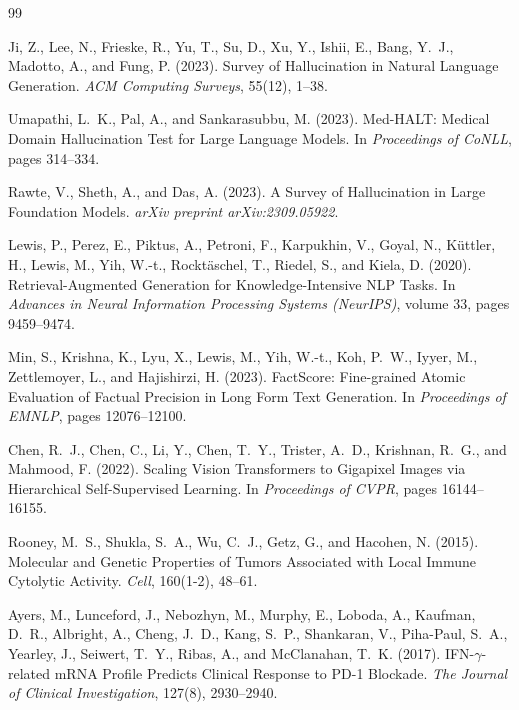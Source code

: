 \documentclass[11pt,twocolumn]{article}
\begin{document}
\begin{thebibliography}{99}

Ji, Z., Lee, N., Frieske, R., Yu, T., Su, D., Xu, Y., Ishii, E., Bang, Y.~J., Madotto, A., and Fung, P. (2023).
Survey of Hallucination in Natural Language Generation.
\emph{ACM Computing Surveys}, 55(12), 1--38.

Umapathi, L.~K., Pal, A., and Sankarasubbu, M. (2023).
Med-HALT: Medical Domain Hallucination Test for Large Language Models.
In \emph{Proceedings of CoNLL}, pages 314--334.

Rawte, V., Sheth, A., and Das, A. (2023).
A Survey of Hallucination in Large Foundation Models.
\emph{arXiv preprint arXiv:2309.05922}.

Lewis, P., Perez, E., Piktus, A., Petroni, F., Karpukhin, V., Goyal, N., K{\"u}ttler, H., Lewis, M., Yih, W.-t., Rockt{\"a}schel, T., Riedel, S., and Kiela, D. (2020).
Retrieval-Augmented Generation for Knowledge-Intensive NLP Tasks.
In \emph{Advances in Neural Information Processing Systems (NeurIPS)}, volume 33, pages 9459--9474.

Min, S., Krishna, K., Lyu, X., Lewis, M., Yih, W.-t., Koh, P.~W., Iyyer, M., Zettlemoyer, L., and Hajishirzi, H. (2023).
FactScore: Fine-grained Atomic Evaluation of Factual Precision in Long Form Text Generation.
In \emph{Proceedings of EMNLP}, pages 12076--12100.

Chen, R.~J., Chen, C., Li, Y., Chen, T.~Y., Trister, A.~D., Krishnan, R.~G., and Mahmood, F. (2022).
Scaling Vision Transformers to Gigapixel Images via Hierarchical Self-Supervised Learning.
In \emph{Proceedings of CVPR}, pages 16144--16155.

Rooney, M.~S., Shukla, S.~A., Wu, C.~J., Getz, G., and Hacohen, N. (2015).
Molecular and Genetic Properties of Tumors Associated with Local Immune Cytolytic Activity.
\emph{Cell}, 160(1-2), 48--61.

Ayers, M., Lunceford, J., Nebozhyn, M., Murphy, E., Loboda, A., Kaufman, D.~R., Albright, A., Cheng, J.~D., Kang, S.~P., Shankaran, V., Piha-Paul, S.~A., Yearley, J., Seiwert, T.~Y., Ribas, A., and McClanahan, T.~K. (2017).
IFN-$\gamma$-related mRNA Profile Predicts Clinical Response to PD-1 Blockade.
\emph{The Journal of Clinical Investigation}, 127(8), 2930--2940.


\end{thebibliography}
\end{document}
